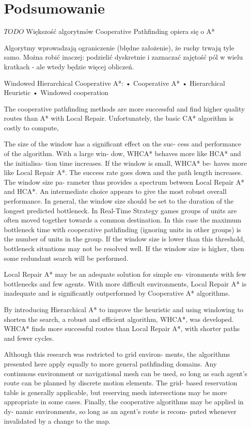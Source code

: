 \chapter{Podsumowanie}
\label{ch:podsumowanie}

$TODO$
Większość algorytmów Cooperative Pathfinding opiera się o A*

Algorytmy wprowadzają ograniczenie (błędne założenie), że ruchy trwają tyle samo. Można robić inaczej: podzielić dyskretnie i zaznaczać zajętość pól w wielu kratkach - ale wtedy będzie więcej obliczeń.

Windowed Hierarchical Cooperative A*:
• Cooperative A*
• Hierarchical Heuristic
• Windowed cooperation

The cooperative pathfinding methods are more successful
and find higher quality routes than A* with Local Repair.
Unfortunately, the basic CA* algorithm is costly to compute,

The size of the window has a significant effect on the suc-
cess and performance of the algorithm. With a large win-
dow, WHCA* behaves more like HCA* and the initialisa-
tion time increases. If the window is small, WHCA* be-
haves more like Local Repair A*. The success rate goes
down and the path length increases. The window size pa-
rameter thus provides a spectrum between Local Repair A*
and HCA*. An intermediate choice appears to give the most robust overall performance.
In general, the window size should be set to the duration
of the longest predicted bottleneck. In Real-Time Strategy
games groups of units are often moved together towards a
common destination. In this case the maximum bottleneck
time with cooperative pathfinding (ignoring units in other
groups) is the number of units in the group. If the window
size is lower than this threshold, bottleneck situations may
not be resolved well. If the window size is higher, then some
redundant search will be performed.

Local Repair A* may be an adequate solution for simple en-
vironments with few bottlenecks and few agents. With more
difficult environments, Local Repair A* is inadequate and is
significantly outperformed by Cooperative A* algorithms.

By introducing Hierarchical A* to improve the heuristic and
using windowing to shorten the search, a robust and efficient
algorithm, WHCA*, was developed. WHCA* finds more
successful routes than Local Repair A*, with shorter paths
and fewer cycles.

Although this research was restricted to grid environ-
ments, the algorithms presented here apply equally to more
general pathfinding domains. Any continuous environment
or navigational mesh can be used, so long as each agent’s
route can be planned by discrete motion elements. The grid-
based reservation table is generally applicable, but reserving
mesh intersections may be more appropriate in some cases.
Finally, the cooperative algorithms may be applied in dy-
namic environments, so long as an agent’s route is recom-
puted whenever invalidated by a change to the map.


